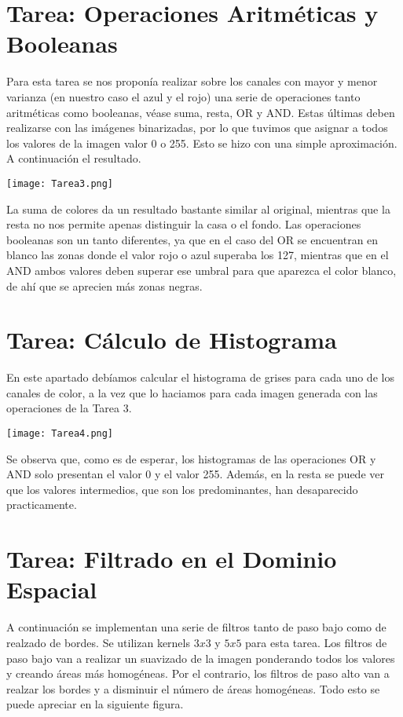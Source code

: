 \documentclass{article}
\begin{document}
\section{Tarea: Operaciones Aritméticas y Booleanas}

Para esta tarea se nos proponía realizar sobre los canales con mayor y menor varianza (en nuestro caso el azul y el rojo) una serie de operaciones tanto aritméticas como booleanas, véase suma, resta, OR y AND. Estas últimas deben realizarse con las imágenes binarizadas, por lo que tuvimos que asignar a todos los valores de la imagen valor 0 o 255. Esto se hizo con una simple aproximación. A continuación el resultado.

\centering
\texttt{[image: Tarea3.png]}
\raggedright

La suma de colores da un resultado bastante similar al original, mientras que la resta no nos permite apenas distinguir la casa o el fondo. Las operaciones booleanas son un tanto diferentes, ya que en el caso del OR se encuentran en blanco las zonas donde el valor rojo o azul superaba los 127, mientras que en el AND ambos valores deben superar ese umbral para que aparezca el color blanco, de ahí que se aprecien más zonas negras.

\section{Tarea: Cálculo de Histograma}

En este apartado debíamos calcular el histograma de grises para cada uno de los canales de color, a la vez que lo haciamos para cada imagen generada con las operaciones de la Tarea 3. 

\centering
\texttt{[image: Tarea4.png]}
\raggedright

Se observa que, como es de esperar, los histogramas de las operaciones OR y AND solo presentan el valor 0 y el valor 255. Además, en la resta se puede ver que los valores intermedios, que son los predominantes, han desaparecido practicamente.

\section{Tarea: Filtrado en el Dominio Espacial}

A continuación se implementan una serie de filtros tanto de paso bajo como de realzado de bordes. Se utilizan kernels $3x3$ y $5x5$ para esta tarea. Los filtros de paso bajo van a realizar un suavizado de la imagen ponderando todos los valores y creando áreas más homogéneas. Por el contrario, los filtros de paso alto van a realzar los bordes y a disminuir el número de áreas homogéneas. Todo esto se puede apreciar en la siguiente figura.
\end{document}
